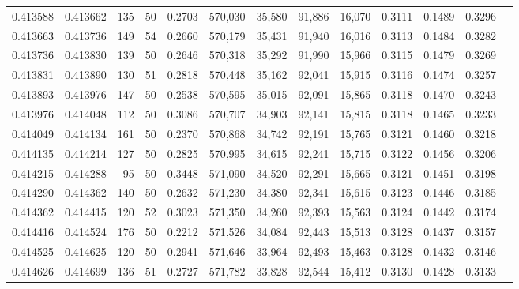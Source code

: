 \begin{tabular}{rrrrrrrrrrrrr}
0.413588 & 0.413662 &   135 &  50 &                                     0.2703 & 570,030 &  35,580 &  91,886 &  16,070 & 0.3111 & 0.1489 & 0.3296 \\
0.413663 & 0.413736 &   149 &  54 &                                     0.2660 & 570,179 &  35,431 &  91,940 &  16,016 & 0.3113 & 0.1484 & 0.3282 \\
0.413736 & 0.413830 &   139 &  50 &                                     0.2646 & 570,318 &  35,292 &  91,990 &  15,966 & 0.3115 & 0.1479 & 0.3269 \\
0.413831 & 0.413890 &   130 &  51 &                                     0.2818 & 570,448 &  35,162 &  92,041 &  15,915 & 0.3116 & 0.1474 & 0.3257 \\
0.413893 & 0.413976 &   147 &  50 &                                     0.2538 & 570,595 &  35,015 &  92,091 &  15,865 & 0.3118 & 0.1470 & 0.3243 \\
0.413976 & 0.414048 &   112 &  50 &                                     0.3086 & 570,707 &  34,903 &  92,141 &  15,815 & 0.3118 & 0.1465 & 0.3233 \\
0.414049 & 0.414134 &   161 &  50 &                                     0.2370 & 570,868 &  34,742 &  92,191 &  15,765 & 0.3121 & 0.1460 & 0.3218 \\
0.414135 & 0.414214 &   127 &  50 &                                     0.2825 & 570,995 &  34,615 &  92,241 &  15,715 & 0.3122 & 0.1456 & 0.3206 \\
0.414215 & 0.414288 &    95 &  50 &                                     0.3448 & 571,090 &  34,520 &  92,291 &  15,665 & 0.3121 & 0.1451 & 0.3198 \\
0.414290 & 0.414362 &   140 &  50 &                                     0.2632 & 571,230 &  34,380 &  92,341 &  15,615 & 0.3123 & 0.1446 & 0.3185 \\
0.414362 & 0.414415 &   120 &  52 &                                     0.3023 & 571,350 &  34,260 &  92,393 &  15,563 & 0.3124 & 0.1442 & 0.3174 \\
0.414416 & 0.414524 &   176 &  50 &                                     0.2212 & 571,526 &  34,084 &  92,443 &  15,513 & 0.3128 & 0.1437 & 0.3157 \\
0.414525 & 0.414625 &   120 &  50 &                                     0.2941 & 571,646 &  33,964 &  92,493 &  15,463 & 0.3128 & 0.1432 & 0.3146 \\
0.414626 & 0.414699 &   136 &  51 &                                     0.2727 & 571,782 &  33,828 &  92,544 &  15,412 & 0.3130 & 0.1428 & 0.3133 \\

\end{tabular}
